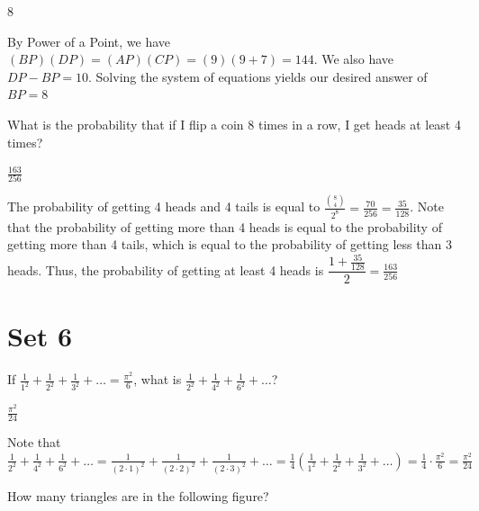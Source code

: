 \documentclass[11pt]{article}
\begin{document}
\begin{answer}
8
\end{answer}

\begin{solution}
By Power of a Point, we have $(BP)(DP) = (AP)(CP) = (9)(9+7) = 144$. We also have $DP-BP = 10$. Solving the system of equations yields our desired answer of $BP=\boxed{8}$
\end{solution}

\begin{problem}
What is the probability that if I flip a coin 8 times in a row, I get heads at least 4 times?
\end{problem}

\begin{answer}
$\frac{163}{256}$
\end{answer}

\begin{solution}
The probability of getting 4 heads and 4 tails is equal to $\frac{8 \choose 4}{2^8} = \frac{70}{256} = \frac{35}{128}$. Note that the probability of getting more than 4 heads is equal to the probability of getting more than 4 tails, which is equal to the probability of getting less than 3 heads. Thus, the probability of getting at least 4 heads is $\dfrac{1+\frac{35}{128}}{2} = \boxed{\frac{163}{256}}$
\end{solution}

\newpage
\section*{Set 6}
\begin{problem}
If $\frac{1}{1^2} + \frac{1}{2^2} + \frac{1}{3^2} + \dots = \frac{\pi^2}{6}$, what is $\frac{1}{2^2} + \frac{1}{4^2} + \frac{1}{6^2} + \ldots$?
\end{problem}

\begin{answer}
$\frac{\pi^2}{24}$
\end{answer}

\begin{solution}
Note that $\frac{1}{2^2} + \frac{1}{4^2} + \frac{1}{6^2} + \ldots = \frac{1}{(2 \cdot 1)^2} + \frac{1}{(2 \cdot 2)^2} + \frac{1}{(2 \cdot 3)^2} + \dots = \frac{1}{4}\left(\frac{1}{1^2} + \frac{1}{2^2} + \frac{1}{3^2} + \dots\right) = \frac{1}{4} \cdot \frac{\pi^2}{6} = \boxed{\frac{\pi^2}{24}}$
\end{solution}

\begin{problem}
How many triangles are in the following figure?
    
    \begin{center}
    \end{center}
    
\end{problem}
\end{document}
